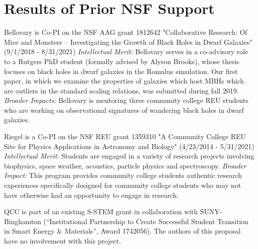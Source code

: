 \documentclass[12pt]{article}
\begin{document}
\section{Results of Prior NSF Support}
\vspace{-3mm}
Bellovary is Co-PI on the NSF AAG grant 1812642 "Collaborative Research: Of Mice and Monsters -- Investigating the Growth of Black Holes in Dwarf Galaxies" (9/1/2018 - 8/31/2021)  {\em Intellectual Merit:}  Bellovary serves in a co-advisory role to a Rutgers PhD student (formally advised by Alyson Brooks), whose thesis focuses on black holes in dwarf galaxies in the Romulus simulation.  Our first paper, in which we examine the properties of galaxies which host MBHs which are outliers in the standard scaling relations, was submitted during fall 2019.  {\em Broader Impacts:}  Bellovary is mentoring three community college REU students who are working on observational signatures of wandering black holes in dwarf galaxies.

Riegel is a Co-PI on the NSF REU grant 1359310 "A Community College REU Site for Physics Applications in Astronomy and Biology" (4/23/2014 - 5/31/2021) {\em Intellectual Merit:} Students are engaged in a variety of research projects involving biophysics, space weather, acoustics, particle physics and spectroscopy. {\em Broader Impact:} This program provides community college students authentic research experiences specifically designed for community college students who may not have otherwise had an opportunity to engage in research. 

QCC is part of an existing S-STEM grant in collaboration with SUNY-Binghamton (``Institutional Partnership to Create Successful Student Transition in Smart Energy \& Materials'', Award 1742056).  The authors of this proposal have no involvement with this project.

\newpage

\end{document}
